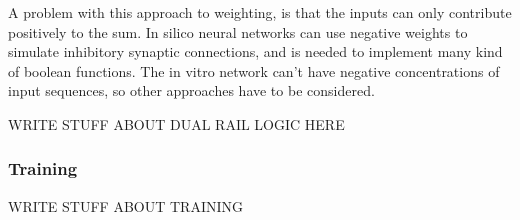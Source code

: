 A problem with this approach to weighting, is that the inputs can only contribute positively to the sum. In silico neural networks can use negative weights to simulate inhibitory synaptic connections, and is needed to implement many kind of boolean functions. The in vitro network can't have negative concentrations of input sequences, so other approaches have to be considered.

WRITE STUFF ABOUT DUAL RAIL LOGIC HERE

\subsubsection{Training}
WRITE STUFF ABOUT TRAINING
